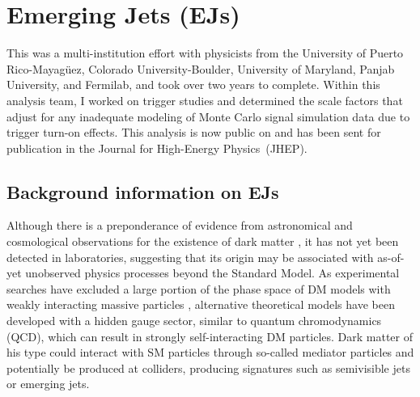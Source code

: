 \chapter{Emerging Jets (EJs) \label{ch:emj}}

This was a multi-institution effort with physicists from the University of Puerto Rico-Mayagüez, Colorado University-Boulder, University of Maryland, Panjab University, and Fermilab, and took over two years to complete. Within this analysis team, I worked on trigger studies and determined the scale factors that adjust for any inadequate modeling of Monte Carlo signal simulation data due to trigger turn-on effects. This analysis is now public on \cite{CMS:2024gxp} and has been sent for publication in the Journal for High-Energy Physics (JHEP).

\section{Background information on EJs}

Although there is a preponderance of evidence from astronomical and cosmological observations for the existence of dark matter \cite{What_is_DM}, it has not yet been detected in laboratories, suggesting that its origin may be associated with as-of-yet unobserved physics processes beyond the Standard Model.
As experimental searches have excluded a large portion of the phase space of DM models with weakly interacting massive particles \cite{WIMPS}, alternative theoretical models have been developed with a hidden gauge sector, similar to quantum chromodynamics (QCD), which can result in strongly self-interacting DM particles. Dark matter of his type could interact with SM particles through so-called mediator particles and potentially be produced at colliders, producing signatures such as semivisible jets \cite{Nabili:2886140} or emerging jets\cite{sirunyan2019search}.

